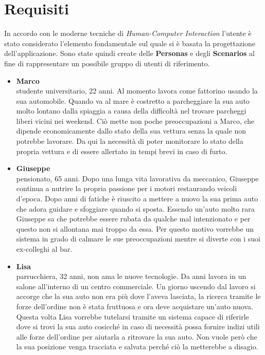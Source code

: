 \documentclass{report}
\begin{document}
\section{Requisiti}
In accordo con le moderne tecniche di \textit{Human-Computer Interaction} l'utente è stato considerato l'elemento fondamentale sul quale si è basata la progettazione dell'applicazione. Sono state quindi create delle \textbf{Personas} e degli \textbf{Scenarios} al fine di rappresentare un possibile gruppo di utenti di riferimento.
\begin{itemize}
    \item \textbf{Marco}\\studente universitario, 22 anni. Al momento lavora come fattorino usando la sua automobile. Quando va al mare è costretto a parcheggiare la sua auto molto lontano dalla spiaggia a causa della difficoltà nel trovare parcheggi liberi vicini nei weekend. Ciò mette non poche preoccupazioni a Marco, che dipende economicamente dallo stato della sua vettura senza la quale non potrebbe lavorare. Da qui la necessità di poter monitorare lo stato della propria vettura e di essere allertato in tempi brevi in caso di furto.

    \item \textbf{Giuseppe}\\pensionato, 65 anni. Dopo una lunga vita lavorativa da meccanico, Giuseppe continua a nutrire la propria passione per i motori restaurando veicoli d'epoca. Dopo anni di fatiche è riuscito a mettere a nuovo la sua prima auto che adora guidare e sfoggiare quando si sposta. Essendo un'auto molto rara Giuseppe sa che potrebbe essere rubata da qualche mal intenzionato e per questo non si allontana mai troppo da essa. Per questo motivo vorrebbe un sistema in grado di calmare le sue preoccupazioni mentre si diverte con i suoi ex-colleghi al bar.

    \item \textbf{Lisa}\\parrucchiera, 32 anni, non ama le nuove tecnologie. Da anni lavora in un salone all'interno di un centro commerciale. Un giorno uscendo dal lavoro si accorge che la sua auto non era più dove l'aveva lasciata, la ricerca tramite le forze dell'ordine non è stata fruttuosa e ora deve acquistare un'auto nuova. Questa volta Lisa vorrebbe tutelarsi tramite un sistema capace di riferirle dove si trovi la sua auto cosicché in caso di necessità possa fornire indizi utili alle forze dell'ordine per aiutarla a ritrovare la sua auto. Non vuole però che la sua posizione venga tracciata e salvata perché ciò la metterebbe a disagio.
\end{itemize}
\end{document}
